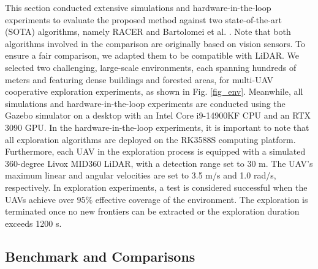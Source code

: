 \documentclass[letterpaper, 10pt, journal, twoside]{support/IEEEtran}
\begin{document}
This section conducted extensive simulations and hardware-in-the-loop experiments to evaluate the proposed method against two state-of-the-art (SOTA) algorithms, namely RACER \cite{zhou2023racer} and Bartolomei et al. \cite{bartolomei2023fast}. Note that both algorithms involved in the comparison are originally based on vision sensors. To ensure a fair comparison, we adapted them to be compatible with LiDAR. 
We selected two challenging, large-scale environments, each spanning hundreds of meters and featuring dense buildings and forested areas, for multi-UAV cooperative exploration experiments, as shown in Fig. \ref{fig_env}. 
Meanwhile, all simulations and hardware-in-the-loop experiments are conducted using the Gazebo simulator on a desktop with an Intel Core i9-14900KF CPU and an RTX 3090 GPU. In the hardware-in-the-loop experiments, it is important to note that all exploration algorithms are deployed on the RK3588S computing platform. Furthermore, each UAV in the exploration process is equipped with a simulated 360-degree Livox MID360 LiDAR, with a detection range set to 30 m. The UAV's maximum linear and angular velocities are set to 3.5 m/s and 1.0 rad/s, respectively. 
In exploration experiments, a test is considered successful when the UAVs achieve over $95\%$ effective coverage of the environment. The exploration is terminated once no new frontiers can be extracted or the exploration duration exceeds 1200 s.

\subsection{Benchmark and Comparisons}
\label{subsec:sim_benchmark}
\end{document}
